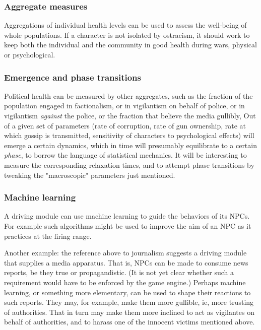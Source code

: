 \subsubsection{Aggregate measures}

Aggregations of individual health levels can be used to assess the well-being
of whole populations.
If a character is not isolated by ostracism, it should work to keep both the
individual and the community in good health during wars, physical or
psychological.

\subsubsection{Emergence and phase transitions}

Political health can be measured by other aggregates, such as the fraction of
the population engaged in factionalism, or in vigilantism on behalf of police,
or in vigilantism {\em against} the police, or the fraction that believe the
media gullibly, \etc\@
Out of a given set of parameters (rate of corruption, rate of gun ownership,
rate at which gossip is transmitted, sensitivity of characters to
psychological effects) will emerge a certain dynamics, which
in time will presumably equilibrate to a certain {\em phase}, to borrow the
language of statistical mechanics.
It will be interesting to measure the corresponding relaxation
times, and to attempt phase transitions by tweaking the "macroscopic"
parameters just mentioned.

\subsubsection{Machine learning}

A driving module can use machine learning
to guide the behaviors of its NPCs. For example such algorithms
might be used to improve the aim of an NPC as it practices at the firing range.

Another example: the reference above to journalism suggests a driving module
that supplies a media apparatus.
That is, NPCs can be made to consume news
reports, be they true or propagandistic. (It is not yet clear whether
such a requirement would have to be enforced by the game engine.) Perhaps
machine learning, or something more elementary, can be used to shape their
reactions to such reports.
They may, for example, make them more gullible,
ie, more trusting of authorities.
That in turn may make them more inclined
to act as vigilantes on behalf of authorities, and to harass one of the
innocent victims mentioned above.
